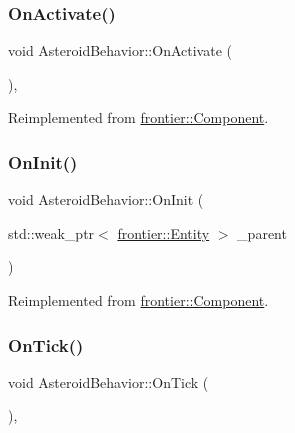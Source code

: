 \subsubsection{\texorpdfstring{On\+Activate()}{OnActivate()}}
{\footnotesize\ttfamily void Asteroid\+Behavior\+::\+On\+Activate (\begin{DoxyParamCaption}{ }\end{DoxyParamCaption})\hspace{0.3cm}{\ttfamily [override]}, {\ttfamily [virtual]}}



Reimplemented from \hyperlink{classfrontier_1_1_component_a77fca7ba1960aafb9bc05905e300c79d}{frontier\+::\+Component}.

\mbox{\label{class_asteroid_behavior_a79d9559f0d8e109e928acf7f8ff7acea}} 
\subsubsection{\texorpdfstring{On\+Init()}{OnInit()}}
{\footnotesize\ttfamily void Asteroid\+Behavior\+::\+On\+Init (\begin{DoxyParamCaption}\item[{std\+::weak\+\_\+ptr$<$ \hyperlink{classfrontier_1_1_entity}{frontier\+::\+Entity} $>$}]{\+\_\+parent }\end{DoxyParamCaption})\hspace{0.3cm}{\ttfamily [virtual]}}



Reimplemented from \hyperlink{classfrontier_1_1_component_af3da02905c4d79219d9b12f260a35ad1}{frontier\+::\+Component}.

\mbox{\label{class_asteroid_behavior_a3c1287599e132b49be851d9eeec6380e}} 
\subsubsection{\texorpdfstring{On\+Tick()}{OnTick()}}
{\footnotesize\ttfamily void Asteroid\+Behavior\+::\+On\+Tick (\begin{DoxyParamCaption}{ }\end{DoxyParamCaption})\hspace{0.3cm}{\ttfamily [override]}, {\ttfamily [virtual]}}



